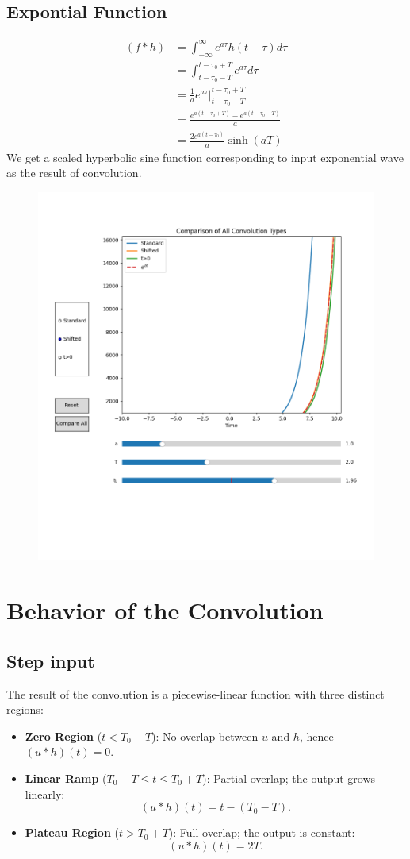 \documentclass[12pt,a4paper]{report}
\newcommand{\brak}[1]{\ensuremath{\left(#1\right)}}
\providecommand{\brak}[1]{\ensuremath{\left(#1\right)}}
\begin{document}
\section{Expontial Function}
\begin{align*}
\brak{f \ast h} &= \int_{-\infty}^{\infty} e^{a\tau} h(t - \tau) d\tau \\
&= \int_{t-\tau_0-T}^{t-\tau_0+T} e^{a\tau} d\tau \\
&= \frac{1}{a} e^{a\tau} \Big|_{t-\tau_0-T}^{t-\tau_0+T} \\
&= \frac{e^{a(t-\tau_0+T)} - e^{a(t-\tau_0-T)}}{a} \\
&= \frac{2e^{a(t-\tau_0)}}{a} \sinh(aT)
\end{align*}
We get a  scaled hyperbolic sine function corresponding to input exponential wave as the result of convolution.
\begin{figure}[h!]
    \centering
    \includegraphics[width=0.7\linewidth]{figs/exp_conv.png}
    \label{fig:enter-label}
\end{figure}
\chapter{Behavior of the Convolution}
\section{Step input}
The result of the convolution is a piecewise-linear function with three distinct regions:

\begin{itemize}
    \item \textbf{Zero Region} ($t < T_0 - T$): No overlap between $u$ and $h$, hence $(u * h)(t) = 0$.
    \item \textbf{Linear Ramp} ($T_0 - T \leq t \leq T_0 + T$): Partial overlap; the output grows linearly:
    \[
    (u * h)(t) = t - (T_0 - T).
    \]
    \item \textbf{Plateau Region} ($t > T_0 + T$): Full overlap; the output is constant:
    \[
    (u * h)(t) = 2T.
    \]
\end{itemize}
\end{document}

